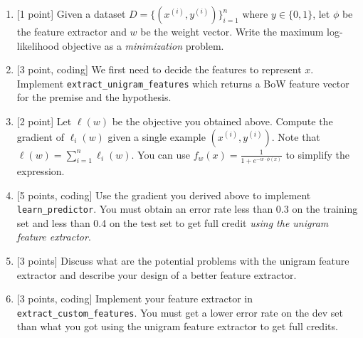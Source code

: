 \documentclass{article}
\theoremstyle{case}
\theoremstyle{definition}
\begin{document}
\begin{enumerate}
    \item {[1 point]} Given a dataset $D=\{(x^{(i)}, y^{(i)})\}_{i=1}^n$ where $y\in\{0,1\}$, let $\phi$ be the feature extractor and $w$ be the weight vector. Write the maximum log-likelihood objective as a \textit{minimization} problem.
    \begin{shaded}
        
    \end{shaded}

    \newpage
    \item {[3 point, coding]} We first need to decide the features to represent $x$.
        Implement \texttt{extract\_unigram\_features} which returns a BoW feature vector for the premise and the hypothesis.
        \begin{shaded}

        \end{shaded}

    \newpage
    \item {[2 point]} Let $\ell(w)$ be the objective you obtained above.
    Compute the gradient of $\ell_i(w)$ given a single example $(x^{(i)}, y^{(i)})$.
        Note that $\ell(w) = \sum_{i=1}^n \ell_i(w)$.
        You can use $f_w(x) = \frac{1}{1 + e^{-w\cdot\phi(x)}}$
        to simplify the expression.
    \begin{shaded}
        
    \end{shaded}

    \newpage
    \item {[5 points, coding]} Use the gradient you derived above to implement \texttt{learn\_predictor}.
        You must obtain an error rate less than 0.3 on the training set and less than 0.4 on the test set to get full credit \emph{using the unigram feature extractor}.
        \begin{shaded}
            
        \end{shaded}

    \newpage
    \item {[3 points]} Discuss what are the potential problems with the unigram feature extractor
        and describe your design of a better feature extractor. 
        \begin{shaded}
        \end{shaded}

    \newpage
    \item {[3 points, coding]}
        Implement your feature extractor in \texttt{extract\_custom\_features}.
        You must get a lower error rate on the dev set than what you got using the unigram feature extractor to get full credits.
        \begin{shaded}
            

\end{shaded}
\end{enumerate}
\end{document}
